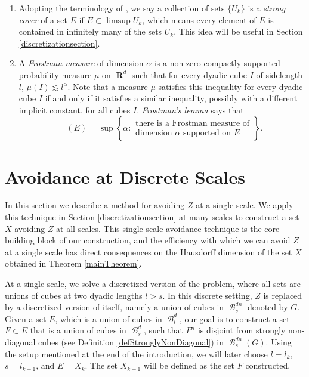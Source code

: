 \documentclass[dvipsnames,letterpaper,12pt]{article}
\numberwithin{equation}{section}
\theoremstyle{plain}
\theoremstyle{remark}
\DeclareMathOperator{\hausdim}{\dim_{\mathbf{H}}}
\DeclareMathOperator{\RR}{\mathbf{R}}
\DeclareMathOperator{\setcolon}{\colon}
\DeclareMathOperator{\B}{\mathcal{B}}
\begin{document}
\begin{enumerate}
	\item\label{defStrongCover} Adopting the terminology of \cite{KatzTao}, we say a collection of sets $\{ U_k \}$ is a {\it strong cover} of a set $E$ if $E \subset \limsup U_k$, which means every element of $E$ is contained in infinitely many of the sets $U_k$. This idea will be useful in Section \ref{discretizationsection}.  

	\item\label{defFrostmanItem} A {\it Frostman measure} of dimension $\alpha$ is a non-zero compactly supported probability measure $\mu$ on $\RR^d$ such that for every dyadic cube $I$ of sidelength $l$, $\mu(I) \lesssim l^\alpha$. Note that a measure $\mu$ satisfies this inequality for every dyadic cube $I$ if and only if it satisfies a similar inequality, possibly with a different implicit constant, for all cubes $I$. {\it Frostman's lemma} says that
	\[ \hausdim(E) = \sup \left\{ \alpha \setcolon
		\begin{array}{c}
			\text{there is a Frostman measure of}\\
			\text{dimension $\alpha$ supported on $E$}
		\end{array} \right\}. \]
\end{enumerate}









\section{Avoidance at Discrete Scales}\label{discretesection}

In this section we describe a method for avoiding $Z$ at a single scale. We apply this technique in Section \ref{discretizationsection} at many scales to construct a set $X$ avoiding $Z$ at all scales. This single scale avoidance technique is the core building block of our construction, and the efficiency with which we can avoid $Z$ at a single scale has direct consequences on the Hausdorff dimension of the set $X$ obtained in Theorem \ref{mainTheorem}.

At a single scale, we solve a discretized version of the problem, where all sets are unions of cubes at two dyadic lengths $l > s$. In this discrete setting, $Z$ is replaced by a discretized version of itself, namely a union of cubes in $\B^{dn}_s$ denoted by $G$. Given a set $E$, which is a union of cubes in $\B_l^d$, our goal is to construct a set $F \subset E$ that is a union of cubes in $\B_s^d$, such that $F^n$ is disjoint from strongly non-diagonal cubes (see Definition \ref{defStronglyNonDiagonal}) in $\B^{dn}_s(G)$. Using the setup mentioned at the end of the introduction, we will later choose $l = l_k$, $s = l_{k+1}$, and $E = X_k$. The set $X_{k+1}$ will be defined as the set $F$ constructed.
\end{document}
